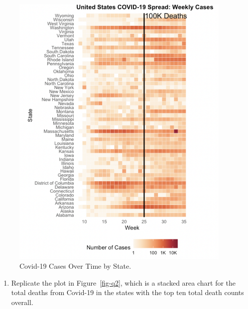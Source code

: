 \documentclass[
  letterpaper,
]{krantz}
\providecommand{\tightlist}{%
  \setlength{\itemsep}{0pt}\setlength{\parskip}{0pt}}\usepackage{longtable,booktabs,array}
\begin{document}
\begin{figure}

{\centering \includegraphics[width=4.16667in,height=\textheight]{book/images/7-exercise1plot.png}

}

\caption{\label{fig-q1}Covid-19 Cases Over Time by State.}

\end{figure}

\begin{enumerate}
\def\labelenumi{\arabic{enumi}.}
\setcounter{enumi}{1}
\tightlist
\item
  Replicate the plot in Figure~\ref{fig-q2}, which is a stacked area
  chart for the total deaths from Covid-19 in the states with the top
  ten total death counts overall.
\end{enumerate}
\end{document}

